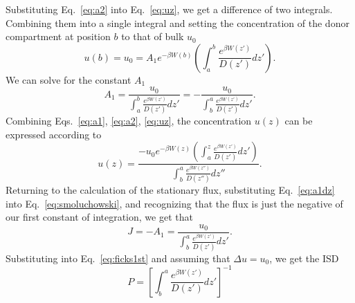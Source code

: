         Substituting Eq.~\ref{eq:a2} into Eq.~\ref{eq:uz}, we get a difference of two integrals. Combining them into a single integral and setting the concentration of the donor compartment at position $b$ to that of bulk $u_0$
        \begin{equation}
            u(b) = u_0 = A_1e^{-\beta W(b)}\left(\int_a^b \frac{e^{\beta W(z')}}{D(z')}dz'\right).
        \end{equation}
        We can solve for the constant $A_1$
        \begin{equation}
            A_1 = \frac{u_0}{\int_a^b \frac{e^{\beta W(z')}}{D(z')}dz'} = -\frac{u_0}{\int_b^a \frac{e^{\beta W(z')}}{D(z')}dz'}.
            \label{eq:a1}
        \end{equation}
        Combining Eqs.~\ref{eq:a1}, \ref{eq:a2}, \ref{eq:uz}, the concentration $u(z)$ can be expressed according to
        \begin{equation}
            u(z) = \frac{-u_0 e^{-\beta W(z)}\left(\int_a^z\frac{e^{\beta W(z')}}{D(z')}dz'\right)}{\int_b^a \frac{e^{\beta W(z'')}}{D(z'')}dz''}.
            \label{eq:uzsolved}
        \end{equation}
        Returning to the calculation of the stationary flux, substituting Eq.~\ref{eq:a1dz} into Eq.~\ref{eq:smoluchowski}, and recognizing that the flux is just the negative of our first constant of integration, we get that
        \begin{equation}
            J = -A_1 = \frac{u_0}{\int_b^a\frac{e^{\beta W(z')}}{D(z')}dz'}.
        \end{equation}
        Substituting into Eq.~\ref{eq:ficks1st} and assuming that $\Delta u = u_0$, we get the ISD
        \begin{equation}
            P = \left[\int_b^a\frac{e^{\beta W(z')}}{D(z')}dz'\right]^{-1}
        \end{equation}

